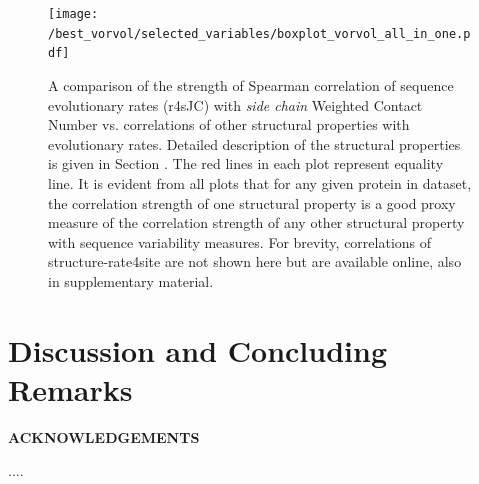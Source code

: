 \documentclass[11pt]{article}
\def\Acknowledgements{\bigskip  \bigskip \begin{center} \begin{large}
             \bf ACKNOWLEDGEMENTS \end{large}\end{center}}
\begin{document}
    \begin{figure}[tbh]
        \begin{center}
        \texttt{[image: /best\_vorvol/selected\_variables/boxplot\_vorvol\_all\_in\_one.pdf]} %
        \end{center}
        \caption{A comparison of the strength of Spearman correlation of sequence evolutionary rates (r4sJC) with {\it side chain} Weighted Contact Number vs. correlations of other structural properties with evolutionary rates. Detailed description of the structural properties is given in Section \label{sec:mam}. The red lines in each plot represent equality line. It is evident from all plots that for any given protein in dataset, the correlation strength of one structural property is a good proxy measure of the correlation strength of any other structural property with sequence variability measures. For brevity, correlations of structure-rate4site are not shown here but are available online, also in supplementary material.}
        \label{fig:best_wcn}
    \end{figure}

\section{Discussion and Concluding Remarks}
\label{sec:dcr}

\Acknowledgements

....



\end{document}
